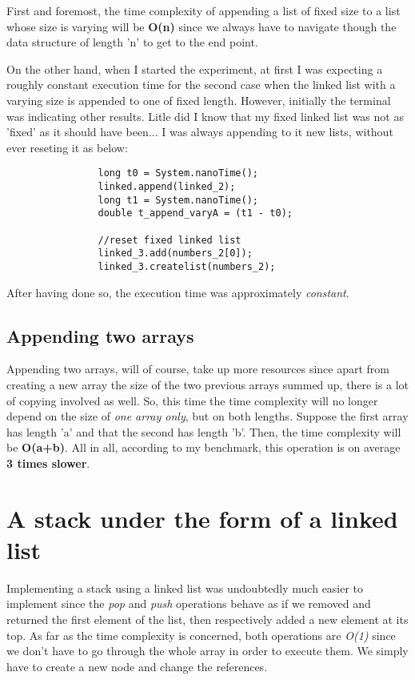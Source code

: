 \documentclass[a4paper,11pt]{article}
\begin{document}
First and foremost, the time complexity of appending a list of fixed size to a list whose size is varying will be \textbf{O(n)}
since we always have to navigate though the data structure of length 'n' to get to the end point. \newline

On the other hand, when I started the experiment, at first I was expecting a roughly constant execution time 
for the second case when the linked list with a varying size
is appended to one of fixed length. However,
initially the terminal was indicating other results.
Litle did I know that my fixed linked list was not as 'fixed' as it should have been... I was always appending to it new lists, 
without ever reseting it as below:


\begin{verbatim}
                long t0 = System.nanoTime();
                linked.append(linked_2); 
                long t1 = System.nanoTime();
                double t_append_varyA = (t1 - t0); 

                //reset fixed linked list
                linked_3.add(numbers_2[0]);
                linked_3.createlist(numbers_2);
\end{verbatim}

After having done so, the execution time was approximately \textit{constant}.


\subsection*{Appending two arrays}

Appending two arrays, will of course, take up more resources since apart from creating a new array the size 
of the two previous arrays summed up, there is a lot of copying involved as well. 
So, this time the time complexity will no longer depend on the size of \textit{one array only}, but on both lengths.
Suppose the first array has length 'a' and that the second has length 'b'. Then, the time complexity will be \textbf{O(a+b)}.
All in all, according to my benchmark, this operation is on average \textbf{3 times slower}.

\section*{A stack under the form of a linked list}

Implementing a stack using a linked list was undoubtedly much easier to implement since the \textit{pop} and \textit{push}
operations behave as if we removed and returned the first element of the list, then respectively added a new element at its top.
As far as the time complexity is concerned, both operations are \textit{O(1)} since we don't have to go through the whole array
in order to execute them. We simply have to create a new node and change the references.
\end{document}
